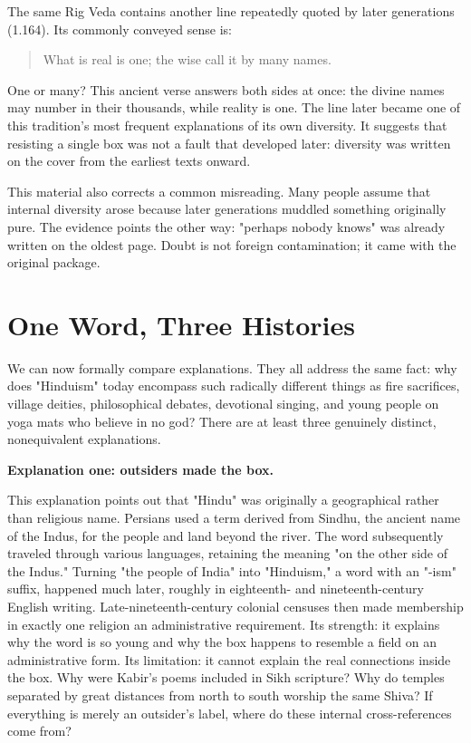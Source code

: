 The same Rig Veda contains another line repeatedly quoted by later generations (1.164). Its commonly conveyed sense is:

\begin{quote}
What is real is one; the wise call it by many names.
\end{quote}
One or many? This ancient verse answers both sides at once: the divine names may number in their thousands, while reality is one. The line later became one of this tradition's most frequent explanations of its own diversity. It suggests that resisting a single box was not a fault that developed later: diversity was written on the cover from the earliest texts onward.

This material also corrects a common misreading. Many people assume that internal diversity arose because later generations muddled something originally pure. The evidence points the other way: "perhaps nobody knows" was already written on the oldest page. Doubt is not foreign contamination; it came with the original package.

\section{One Word, Three Histories}
We can now formally compare explanations. They all address the same fact: why does "Hinduism" today encompass such radically different things as fire sacrifices, village deities, philosophical debates, devotional singing, and young people on yoga mats who believe in no god? There are at least three genuinely distinct, nonequivalent explanations.

\textbf{Explanation one: outsiders made the box.}

This explanation points out that "Hindu" was originally a geographical rather than religious name. Persians used a term derived from Sindhu, the ancient name of the Indus, for the people and land beyond the river. The word subsequently traveled through various languages, retaining the meaning "on the other side of the Indus." Turning "the people of India" into "Hinduism," a word with an "-ism" suffix, happened much later, roughly in eighteenth- and nineteenth-century English writing. Late-nineteenth-century colonial censuses then made membership in exactly one religion an administrative requirement. Its strength: it explains why the word is so young and why the box happens to resemble a field on an administrative form. Its limitation: it cannot explain the real connections inside the box. Why were Kabir's poems included in Sikh scripture? Why do temples separated by great distances from north to south worship the same Shiva? If everything is merely an outsider's label, where do these internal cross-references come from?

